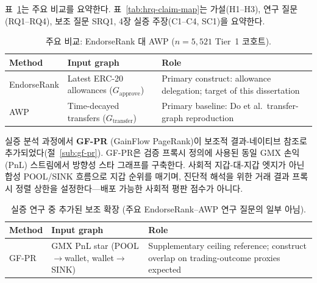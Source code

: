 표~\ref{tab:primary-methods-preview}는 주요 비교를 요약한다. 표~\ref{tab:hrq-claim-map}는 가설(H1--H3), 연구 질문(RQ1--RQ4), 보조 질문 SRQ1, 4장 실증 주장(C1--C4, SC1)을 요약한다.

\begin{table}[htbp]
\centering
\caption{주요 비교: EndorseRank 대 AWP ($n=5{,}521$ Tier~1 코호트).}
\label{tab:primary-methods-preview}
\begin{tabular}{p{2.4cm}p{3.4cm}p{7.4cm}}
\toprule
Method & Input graph & Role \\
\midrule
EndorseRank & Latest ERC-20 allowances ($G_{\text{approve}}$) & Primary construct: allowance delegation; target of this dissertation \\
AWP & Time-decayed transfers ($G_{\text{transfer}}$) & Primary baseline: Do et al.\ transfer-graph reproduction \\
\bottomrule
\end{tabular}
\end{table}


실증 분석 과정에서 \textbf{GF-PR} (GainFlow PageRank)이 보조적 결과-네이티브 참조로 추가되었다(절~\ref{sub:gf-pr}). GF-PR은 검증 프록시 정의에 사용된 동일 GMX 손익(PnL) 스트림에서 방향성 스타 그래프를 구축한다. 사회적 지갑-대-지갑 엣지가 아닌 합성 POOL/SINK 흐름으로 지갑 순위를 매기며, 진단적 해석을 위한 거래 결과 프록시 정렬 상한을 설정한다---배포 가능한 사회적 평판 점수가 아니다.

\begin{table}[htbp]
\centering
\caption{실증 연구 중 추가된 보조 확장 (주요 EndorseRank--AWP 연구 질문의 일부 아님).}
\label{tab:supplementary-gf-pr}
\begin{tabular}{p{2.4cm}p{3.4cm}p{7.4cm}}
\toprule
Method & Input graph & Role \\
\midrule
GF-PR & GMX PnL star (POOL$\to$wallet, wallet$\to$SINK) & Supplementary ceiling reference; construct overlap on trading-outcome proxies expected \\
\bottomrule
\end{tabular}
\end{table}


